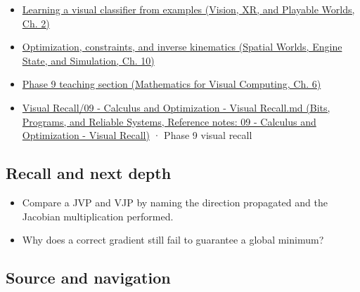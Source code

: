 \begin{itemize}
\tightlist
\item
  \href{../07-Vision-XR-and-Playable-Worlds/main.pdf\#nameddest=04-visual-computing-ii-ch031-learning-a-visual-classifier-from-examples}{Learning a visual classifier from examples (Vision, XR, and Playable Worlds, Ch. 2)}
\item
  \href{../05-Spatial-Worlds-Engine-State-and-Simulation/main.pdf\#nameddest=04-visual-computing-ii-ch029-optimization-constraints-and-inverse-kinematics}{Optimization, constraints, and inverse kinematics (Spatial Worlds, Engine State, and Simulation, Ch. 10)}
\item
  \href{../02-Mathematics-for-Visual-Computing/main.pdf\#nameddest=02-foundations-ii-ch022-numerical-differentiation-and-automatic-differentiation}{Phase 9 teaching section (Mathematics for Visual Computing, Ch. 6)}
\item
  \href{../01-Bits-Programs-and-Reliable-Systems/main.pdf\#nameddest=appendix-adf48f5dc5c1}{Visual Recall/09 - Calculus and Optimization - Visual Recall.md (Bits, Programs, and Reliable Systems, Reference notes: 09 - Calculus and Optimization - Visual Recall)} · Phase 9 visual recall
\end{itemize}

\subsection{Recall and next depth}\label{appendix-40df0855b4a7-recall-and-next-depth}

\hypertarget{appendix-40df0855b4a7-recall-and-next-depth}{}

\begin{itemize}
\tightlist
\item
  Compare a JVP and VJP by naming the direction propagated and the Jacobian multiplication performed.
\item
  Why does a correct gradient still fail to guarantee a global minimum?
\end{itemize}

\subsection{Source and navigation}\label{appendix-40df0855b4a7-source-and-navigation}

\hypertarget{appendix-40df0855b4a7-source-and-navigation}{}

